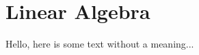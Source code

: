 \documentclass[../main.tex]{subfiles}
\begin{document}
\section{Linear Algebra}

Hello, here is some text without a meaning...
\end{document}
